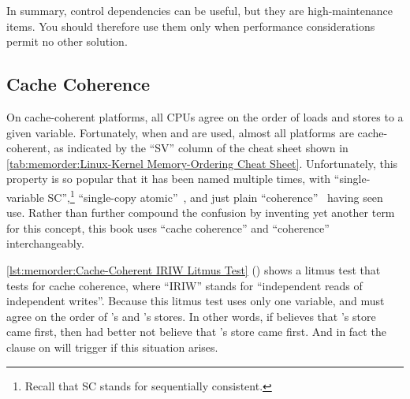In summary, control dependencies can be useful, but they are
high-maintenance items.
You should therefore use them only when performance considerations
permit no other solution.

\QuickQuizEnd

\subsection{Cache Coherence}
\label{sec:memorder:Cache Coherence}

On cache-coherent platforms, all CPUs agree on the order of loads and
stores to a given variable.
Fortunately, when  and  are used,
almost all platforms are cache-coherent, as indicated by the ``SV''
column of the cheat sheet shown in
\cref{tab:memorder:Linux-Kernel Memory-Ordering Cheat Sheet}.
Unfortunately, this property is so popular that it has been named
multiple times, with ``single-variable SC'',\footnote{
	Recall that SC stands for sequentially consistent.}
``single-copy atomic''~\cite{Stone:1995:SP:623262.623912},
and just plain ``coherence''~\cite{JadeAlglave2011ppcmem}
having seen use.
Rather than further compound the confusion by inventing yet another term
for this concept, this book uses ``cache coherence'' and ``coherence''
interchangeably.

\begin{listing}[tbp]

\caption{Cache-Coherent IRIW Litmus Test}
\label{lst:memorder:Cache-Coherent IRIW Litmus Test}
\end{listing}

\begin{fcvref}
\cref{lst:memorder:Cache-Coherent IRIW Litmus Test}
()
shows a litmus test that tests for cache coherence,
where ``IRIW'' stands
for ``independent reads of independent writes''.
Because this litmus test uses only one variable,
 and  must agree
on the order of 's and 's stores.
In other words, if  believes that 's store
came first, then  had better not believe that
's store came first.
And in fact the  clause on  will trigger if this
situation arises.
\end{fcvref}

